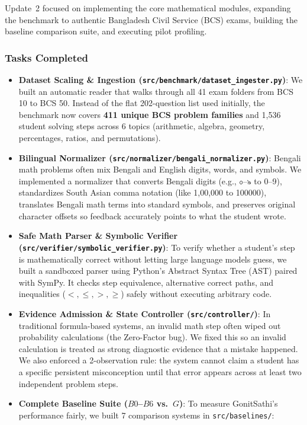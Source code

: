 \documentclass[lettersize,onecolumn,journal]{IEEEtran}
\begin{document}
Update~2 focused on implementing the core mathematical modules, expanding the benchmark to authentic Bangladesh Civil Service (BCS) exams, building the baseline comparison suite, and executing pilot profiling.

\subsubsection{Tasks Completed}
\begin{itemize}
    \item \textbf{Dataset Scaling \& Ingestion (\texttt{src/benchmark/dataset\_ingester.py})}: We built an automatic reader that walks through all 41 exam folders from BCS 10 to BCS 50. Instead of the flat 202-question list used initially, the benchmark now covers \textbf{411 unique BCS problem families} and 1,536 student solving steps across 6 topics (arithmetic, algebra, geometry, percentages, ratios, and permutations).
    \item \textbf{Bilingual Normalizer (\texttt{src/normalizer/bengali\_normalizer.py})}: Bengali math problems often mix Bengali and English digits, words, and symbols. We implemented a normalizer that converts Bengali digits (e.g., ০--৯ to 0--9), standardizes South Asian comma notation (like 1,00,000 to 100000), translates Bengali math terms into standard symbols, and preserves original character offsets so feedback accurately points to what the student wrote.
    \item \textbf{Safe Math Parser \& Symbolic Verifier (\texttt{src/verifier/symbolic\_verifier.py})}: To verify whether a student's step is mathematically correct without letting large language models guess, we built a sandboxed parser using Python's Abstract Syntax Tree (AST) paired with SymPy. It checks step equivalence, alternative correct paths, and inequalities ($<, \le, >, \ge$) safely without executing arbitrary code.
    \item \textbf{Evidence Admission \& State Controller (\texttt{src/controller/})}: In traditional formula-based systems, an invalid math step often wiped out probability calculations (the Zero-Factor bug). We fixed this so an invalid calculation is treated as strong diagnostic evidence that a mistake happened. We also enforced a 2-observation rule: the system cannot claim a student has a specific persistent misconception until that error appears across at least two independent problem steps.
    \item \textbf{Complete Baseline Suite ($B0$--$B6$ vs.~$G$)}: To measure GonitSathi's performance fairly, we built 7 comparison systems in \texttt{src/baselines/}:

\end{itemize}
\end{document}
